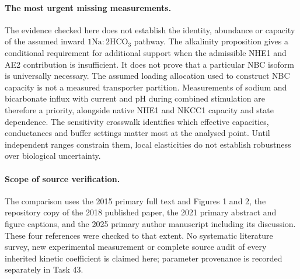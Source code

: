 \paragraph{The most urgent missing measurements.}
The evidence checked here does not establish the identity, abundance
or capacity of the assumed inward $1\mathrm{Na}:2\mathrm{HCO}_3$
pathway. The alkalinity proposition gives a conditional requirement for
additional support when the admissible NHE1 and AE2 contribution is
insufficient. It does not prove that a particular NBC isoform is
universally necessary. The assumed loading allocation used to construct
NBC capacity is not a measured transporter partition.
Measurements of sodium and bicarbonate influx with current and pH
during combined stimulation are therefore a priority, alongside native
NHE1 and NKCC1 capacity and state dependence. The sensitivity crosswalk
identifies which effective capacities, conductances and buffer settings
matter most at the analysed point. Until independent ranges constrain
them, local elasticities do not establish robustness over biological
uncertainty.

\paragraph{Scope of source verification.}
The comparison uses the 2015 primary full text and Figures 1 and 2,
the repository copy of the 2018 published paper, the 2021 primary
abstract and figure captions, and the 2025 primary author manuscript
including its discussion. These four references were checked to that
extent. No systematic literature survey, new experimental measurement
or complete source audit of every inherited kinetic coefficient is
claimed here; parameter provenance is recorded separately in Task 43.
